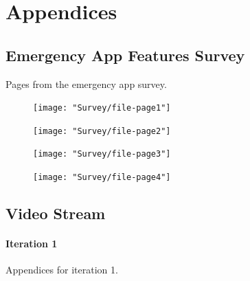 \documentclass{article}
\begin{document}
    \section{Appendices}
    \subsection{Emergency App Features Survey} Pages from the emergency app survey.
    
	\begin{figure}[h]
		\centering
		\texttt{[image: "Survey/file-page1"]}
		\vspace{-100pt}
	\end{figure} \clearpage
    
	\begin{figure}[h]
		\centering
		\texttt{[image: "Survey/file-page2"]}
	\end{figure} \clearpage
    
	\begin{figure}[h]
		\centering
		\texttt{[image: "Survey/file-page3"]}
	\end{figure} \clearpage
    
	\begin{figure}[h]
		\centering
		\texttt{[image: "Survey/file-page4"]}
	\end{figure} \clearpage
	
	
    \subsection{Video Stream}
    \paragraph{Iteration 1} Appendices for iteration 1.
    
\end{document}
